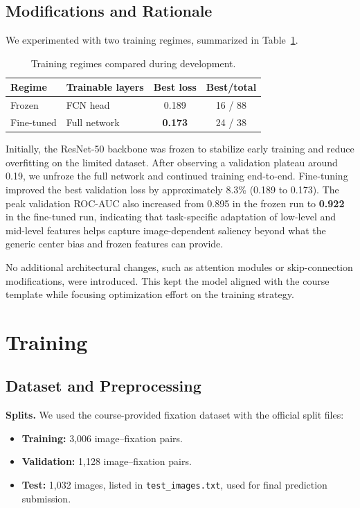 \documentclass[conference]{IEEEtran}
\begin{document}
\subsection{Modifications and Rationale}
We experimented with two training regimes, summarized in Table~\ref{tab:training_regimes}.

\begin{table}[H]
\centering
\small
\setlength{\tabcolsep}{3pt}
\renewcommand{\arraystretch}{1.1}
\begin{tabular}{@{}l l c c@{}}
\toprule
\textbf{Regime} & \textbf{Trainable layers} & \textbf{Best loss} & \textbf{Best/total} \\
\midrule
Frozen & FCN head & 0.189 & 16 / 88 \\
Fine-tuned & Full network & \textbf{0.173} & 24 / 38 \\
\bottomrule
\end{tabular}
\caption{Training regimes compared during development.}
\label{tab:training_regimes}
\end{table}

Initially, the ResNet-50 backbone was frozen to stabilize early training and reduce overfitting on the limited dataset. After observing a validation plateau around 0.19, we unfroze the full network and continued training end-to-end. Fine-tuning improved the best validation loss by approximately 8.3\% (0.189 to 0.173). The peak validation ROC-AUC also increased from 0.895 in the frozen run to \textbf{0.922} in the fine-tuned run, indicating that task-specific adaptation of low-level and mid-level features helps capture image-dependent saliency beyond what the generic center bias and frozen features can provide.

No additional architectural changes, such as attention modules or skip-connection modifications, were introduced. This kept the model aligned with the course template while focusing optimization effort on the training strategy.

\section{Training}

\subsection{Dataset and Preprocessing}
\textbf{Splits.} We used the course-provided fixation dataset with the official split files:
\begin{itemize}[leftmargin=*]
    \item \textbf{Training:} 3,006 image--fixation pairs.
    \item \textbf{Validation:} 1,128 image--fixation pairs.
    \item \textbf{Test:} 1,032 images, listed in \texttt{test\_images.txt}, used for final prediction submission.
\end{itemize}
\end{document}
